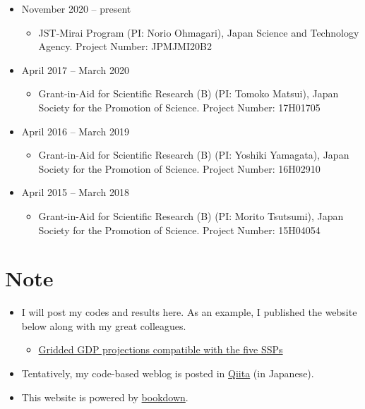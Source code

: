 \documentclass[]{book}
\providecommand{\tightlist}{%
  \setlength{\itemsep}{0pt}\setlength{\parskip}{0pt}}
\begin{document}
\begin{itemize}
\tightlist
\item
  November 2020 -- present

  \begin{itemize}
  \tightlist
  \item
    JST-Mirai Program (PI: Norio Ohmagari),
    Japan Science and Technology Agency.
    Project Number: JPMJMI20B2
  \end{itemize}
\item
  April 2017 -- March 2020

  \begin{itemize}
  \tightlist
  \item
    Grant-in-Aid for Scientific Research (B) (PI: Tomoko Matsui),
    Japan Society for the Promotion of Science.
    Project Number: 17H01705
  \end{itemize}
\item
  April 2016 -- March 2019

  \begin{itemize}
  \tightlist
  \item
    Grant-in-Aid for Scientific Research (B) (PI: Yoshiki Yamagata),
    Japan Society for the Promotion of Science.
    Project Number: 16H02910
  \end{itemize}
\item
  April 2015 -- March 2018

  \begin{itemize}
  \tightlist
  \item
    Grant-in-Aid for Scientific Research (B) (PI: Morito Tsutsumi),
    Japan Society for the Promotion of Science.
    Project Number: 15H04054
  \end{itemize}
\end{itemize}

\hypertarget{note}{%
\chapter*{Note}\label{note}}

\begin{itemize}
\tightlist
\item
  I will post my codes and results here. As an example, I published the website below along with my great colleagues.

  \begin{itemize}
  \tightlist
  \item
    \href{https://gcp-tsukuba.github.io/SSP-downscale/}{Gridded GDP projections compatible with the five SSPs}
  \end{itemize}
\item
  Tentatively, my code-based weblog is posted in \href{https://qiita.com/3tky}{Qiita} (in Japanese).
\item
  This website is powered by \href{https://github.com/rstudio/bookdown}{bookdown}.
\end{itemize}


\end{document}
